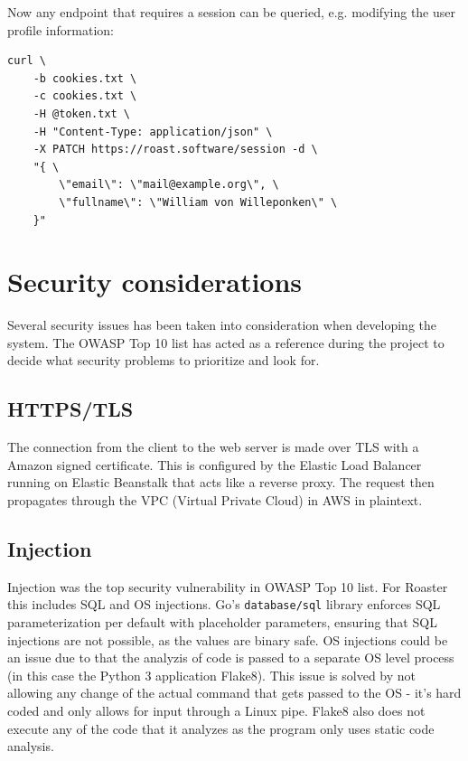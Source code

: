 \documentclass[12pt,a4paper]{report}
\begin{document}
Now any endpoint that requires a session can be queried, e.g. modifying the user profile information:
\begin{verbatim}
curl \
    -b cookies.txt \
    -c cookies.txt \
    -H @token.txt \
    -H "Content-Type: application/json" \
    -X PATCH https://roast.software/session -d \
    "{ \
        \"email\": \"mail@example.org\", \
        \"fullname\": \"William von Willeponken\" \
    }"
\end{verbatim}


\newpage

\chapter{Security considerations}
Several security issues has been taken into consideration when developing the system. The OWASP Top 10 list\cite{owasp-top-10} has acted as a reference during the project to decide what security problems to prioritize and look for.

\section{HTTPS/TLS}
The connection from the client to the web server is made over TLS with a Amazon signed certificate.
This is configured by the Elastic Load Balancer running on Elastic Beanstalk that acts like a reverse proxy.
The request then propagates through the VPC (Virtual Private Cloud) in AWS in plaintext. 

\section{Injection}
Injection was the top security vulnerability in OWASP Top 10 list\cite{owasp-top-10}. For Roaster this includes SQL and OS injections. Go's \texttt{database/sql} library enforces SQL parameterization per default with placeholder parameters\cite{go-database-sql}, ensuring that SQL injections are not possible, as the values are binary safe. OS injections could be an issue due to that the analyzis of code is passed to a separate OS level process (in this case the Python 3 application Flake8). This issue is solved by not allowing any change of the actual command that gets passed to the OS - it's hard coded and only allows for input through a Linux pipe. Flake8 also does not execute any of the code that it analyzes as the program only uses static code analysis\cite{pyflakes}\cite{mccabe}\cite{pycodestyle}.
\end{document}
